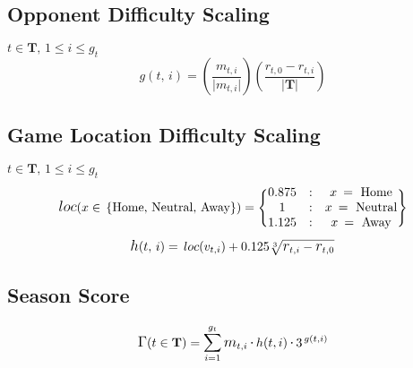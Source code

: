 \documentclass[onecolumn,fleqn,leqno]{article}
\begin{document}
	\subsection{Opponent Difficulty Scaling}
	$t \in \mathbf{T},\, 1 \leq i \leq g_t $
	\begin{equation*}
		g(t,\,i)= \left(\frac{m_{t,i}}{\lvert m_{t,i}\rvert}\right)
			\left(\frac{r_{t,0}-r_{t,i}}{\lvert\mathbf{T}\rvert}\right)
	\end{equation*}
	
	\subsection{Game Location Difficulty Scaling}
	$t \in \mathbf{T},\, 1 \leq i \leq g_t $
	\begin{equation*}
		\mathlarger{loc}(x \in\,\text{\{Home, Neutral, Away\}})=\Biggl\{
			\begin{matrix}
				0.875 &: &x\:=\text{ Home} \\
				1 &: &x\:=\text{ Neutral} \\
				1.125 &: &x\:=\text{ Away}
			\end{matrix}			
		\Biggr\}
	\end{equation*}
	\begin{equation*}
		\mathlarger{h}(t, \,i)= \,loc(v_{t,i})+0.125\sqrt[3]{
			\mathlarger{r}_{t,i}-\mathlarger{r}_{t,0}}
	\end{equation*}
	
	\subsection{Season Score}
	\begin{equation*}
		\mathlarger{\Gamma}(t \in \mathbf{T})= 
			\mathlarger{\sum}_{i=1}^{g_t}
			\,\mathlarger{m}_{t,i}\,\mathlarger{\cdot}\,
			h(t,i)\,\mathlarger{\cdot}\,3^{\,g(t,i)}
	\end{equation*}
	
\end{document}
